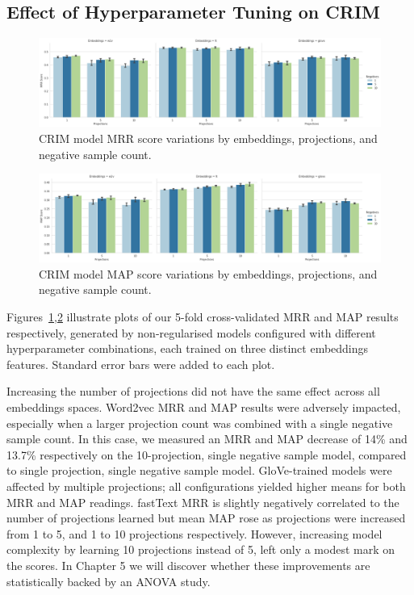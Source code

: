 \subsection{Effect of Hyperparameter Tuning on CRIM} \label{hyper_effect_CRIM}
\begin{figure}[ht!] 
  \centering
  \includegraphics[width=1.\linewidth]{images/CRIM_MRR_score_projection_and_negative_sample.png}
  \caption{CRIM model \ac{MRR} score variations by embeddings, projections, and negative sample count.}
  \label{fig:crim_hyper_mrr}
\end{figure}
\begin{figure}[ht!] 
  \centering
  \includegraphics[width=1.\linewidth]{images/CRIM_MAP_score_projection_and_negative_sample.png}
  \caption{CRIM model \ac{MAP} score variations by embeddings, projections, and negative sample count.}
  \label{fig:crim_hyper_map}
\end{figure}
Figures~\ref{fig:crim_hyper_mrr},\ref{fig:crim_hyper_map} illustrate plots of our 5-fold cross-validated \ac{MRR} and \ac{MAP} results respectively, generated by non-regularised models configured with different hyperparameter combinations, each trained on three distinct embeddings features.  Standard error bars were added to each plot.  

Increasing the number of projections did not have the same effect across all embeddings spaces.  Word2vec \ac{MRR} and \ac{MAP} results were adversely impacted, especially when a larger projection count was combined with a single negative sample count.  In this case, we measured an MRR and MAP decrease of 14\% and 13.7\% respectively on the 10-projection, single negative sample model, compared to single projection, single negative sample model.  GloVe-trained models were affected by multiple projections; all configurations yielded higher means for both \ac{MRR} and \ac{MAP} readings.  fastText \ac{MRR} is slightly negatively correlated to the number of projections learned but mean \ac{MAP} rose as projections were increased from 1 to 5, and 1 to 10 projections respectively.  However, increasing model complexity by learning 10 projections instead of 5, left only a modest mark on the scores.  In Chapter 5 we will discover whether these improvements are statistically backed by an \ac{ANOVA} study.

